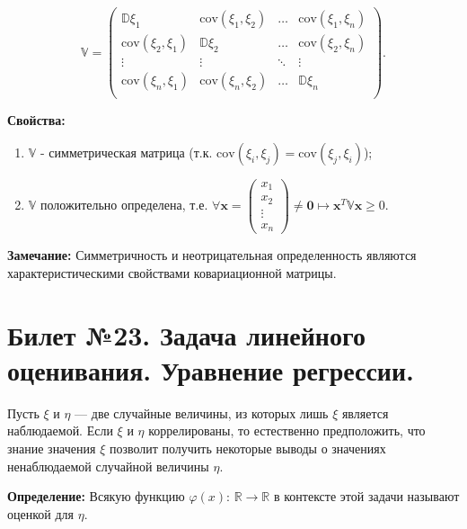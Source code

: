 \begin{equation*}
	\mathbb{V} = \begin{pmatrix}
		\mathbb{D}\xi_{1} & \text{cov}(\xi_{1} , \xi_{2})  & \ldots & \text{cov}(\xi_{1} , \xi_{n})\\
		
		\text{cov}(\xi_{2} , \xi_{1}) & \mathbb{D}\xi_{2}  & \ldots & \text{cov}(\xi_{2} , \xi_{n})\\
		
		\vdots & \vdots & \ddots & \vdots \\
		
		\text{cov}(\xi_{n} , \xi_{1}) & \text{cov}(\xi_{n} , \xi_{2})  & \ldots & \mathbb{D}\xi_{n}\\
	\end{pmatrix}.
\end{equation*}

\textbf{Свойства:}

\begin{enumerate}
    \item $\mathbb{V}$ - симметрическая матрица (т.к. $\text{cov}(\xi_{i} , \xi_{j}) = \text{cov}(\xi_{j} , \xi_{i})$);
    \item $\mathbb{V}$ положительно определена, т.е. $\forall \textbf{x} = \begin{pmatrix}
	x_{1} \\ x_{2} \\ \vdots \\x_{n}
\end{pmatrix} \neq \textbf{0} \longmapsto  \textbf{x}^T\mathbb{V}\textbf{x} \geqslant 0$. 
\end{enumerate}

\textbf{Замечание:} Симметричность и неотрицательная определенность являются характеристическими свойствами ковариационной матрицы.

\section{Билет №23. Задача линейного оценивания. Уравнение регрессии.}

\hspace{\parindent} Пусть $\xi$ и $\eta$ — две случайные величины, из которых лишь $\xi$ является наблюдаемой. Если $\xi$ и $\eta$ коррелированы, то естественно предположить, что знание значения $\xi$  позволит получить некоторые выводы о значениях ненаблюдаемой случайной величины $\eta$. 
\vspace{5mm}

\textbf{Определение:} Всякую функцию $\varphi(x)\text{: }\mathbb{R}\rightarrow\mathbb{R}$ в контексте этой задачи называют оценкой для $\eta$.
\vspace{5mm}

